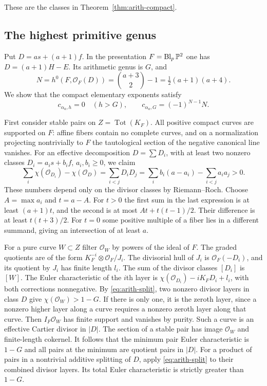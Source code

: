 These are the classes in Theorem~\ref{thm:arith-compact}.

\subsection{The highest primitive genus}

Put $D=as+(a+1)f$. In the presentation $F=\operatorname{Bl}_p\mathbb P^2$
one has $D=(a+1)H-E$. Its arithmetic genus is $G$, and
\[
 N=h^0(F,\mathcal O_F(D))=\binom{a+3}{2}-1
                          =\tfrac12(a+1)(a+4).
\]
We show that the compact elementary exponents satisfy
\begin{equation}\label{eq:arith-minimum}
 c_{\alpha_a,h}=0\quad(h>G),\qquad
 c_{\alpha_a,G}=(-1)^{N-1}N.
\end{equation}

First consider stable pairs on $Z=\operatorname{Tot}(K_F)$. All
positive compact curves are supported on $F$: affine fibers contain
no complete curves, and on a normalization projecting nontrivially
to $F$ the tautological section of the negative canonical line
vanishes. For an effective decomposition $D=\sum D_i$, with at
least two nonzero classes $D_i=a_i s+b_i f$, $a_i,b_i\ge0$, we claim
\begin{equation}\label{eq:arith-split}
 \sum_i\chi(\mathcal O_{D_i})-\chi(\mathcal O_D)
 =\sum_{i<j}D_iD_j
 =\sum_i b_i(a-a_i)-\sum_{i<j}a_i a_j>0.
\end{equation}
These numbers depend only on the divisor classes by Riemann--Roch.
Choose $A=\max a_i$ and $t=a-A$. For $t>0$ the first sum in the
last expression is at least $(a+1)t$, and the second is at most
$At+t(t-1)/2$. Their difference is at least $t(t+3)/2$. For $t=0$
some positive multiple of a fiber lies in a different summand, giving
an intersection of at least $a$.

For a pure curve $W\subset Z$ filter $\mathcal O_W$ by powers of
the ideal of $F$. The graded quotients are of the form
$K_F^{-i}\otimes\mathcal O_F/J_i$. The divisorial hull of $J_i$ is
$\mathcal O_F(-D_i)$, and its quotient by $J_i$ has finite length
$l_i$. The sum of the divisor classes $[D_i]$ is $[W]$. The Euler
characteristic of the $i$th layer is
$\chi(\mathcal O_{D_i})-iK_FD_i+l_i$, with both corrections
nonnegative. By \eqref{eq:arith-split}, two nonzero divisor layers
in class $D$ give $\chi(\mathcal O_W)>1-G$. If there is only one,
it is the zeroth layer, since a nonzero higher layer along a curve
requires a nonzero zeroth layer along that curve. Then
$I_F\mathcal O_W$ has finite support and vanishes by purity. Such a
curve is an effective Cartier divisor in $|D|$. The section of a
stable pair has image $\mathcal O_W$ and finite-length cokernel.
It follows that the minimum pair Euler characteristic is $1-G$ and
all pairs at the minimum are quotient pairs in $|D|$. For a product
of pairs in a nontrivial additive splitting of $D$, apply
\eqref{eq:arith-split} to their combined divisor layers. Its total
Euler characteristic is strictly greater than $1-G$.

